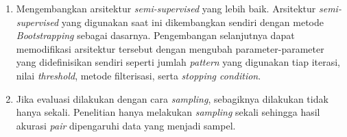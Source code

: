 \begin{enumerate}
  \item Mengembangkan arsitektur \textit{semi-supervised} yang lebih baik. Arsitektur \textit{semi-supervised} yang digunakan saat ini dikembangkan sendiri dengan metode \textit{Bootstrapping} sebagai dasarnya. Pengembangan selanjutnya dapat memodifikasi arsitektur tersebut dengan mengubah parameter-parameter yang didefinisikan sendiri seperti jumlah \textit{pattern} yang digunakan tiap iterasi, nilai \textit{threshold}, metode filterisasi, serta \textit{stopping condition}.
  \item Jika evaluasi dilakukan dengan cara \textit{sampling}, sebagiknya dilakukan tidak hanya sekali. Penelitian hanya melakukan \textit{sampling} sekali sehingga hasil akurasi \textit{pair} dipengaruhi data yang menjadi sampel.
\end{enumerate}


